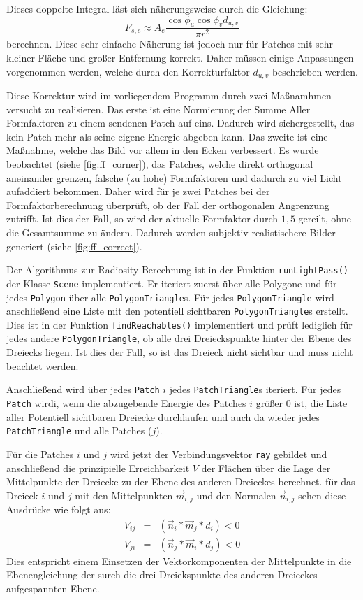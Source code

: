 \documentclass[final,a4paper,11pt,notitlepage,halfparskip]{scrreprt}
\begin{document}
Dieses doppelte Integral läst sich näherungsweise durch die Gleichung:
$$F_{s,e} \approx A_e \frac{\cos\phi_u\cos\phi_v d_{u,v}}{\pi r^2}$$
berechnen. Diese sehr einfache Näherung ist jedoch nur für Patches mit sehr
kleiner Fläche und großer Entfernung korrekt. Daher müssen einige Anpassungen
vorgenommen werden, welche durch den Korrekturfaktor $d_{u,v}$ beschrieben
werden.

Diese Korrektur wird im vorliegendem Programm durch zwei Maßnamhmen versucht zu
realisieren. Das erste ist eine Normierung der Summe Aller Formfaktoren zu einem
sendenen Patch auf eins. Dadurch wird sichergestellt, das kein Patch mehr als
seine eigene Energie abgeben kann. Das zweite ist eine Maßnahme, welche das Bild
vor allem in den Ecken verbessert. Es wurde beobachtet (siehe \ref{fig:ff_corner}), 
das Patches, welche direkt orthogonal aneinander grenzen, falsche (zu hohe) 
Formfaktoren und dadurch zu viel Licht aufaddiert bekommen. Daher wird für je
zwei Patches bei der Formfaktorberechnung überprüft, ob der Fall der
orthogonalen Angrenzung zutrifft. Ist dies der Fall, so wird der aktuelle
Formfaktor durch $1,5$ gereilt, ohne die Gesamtsumme zu ändern. Dadurch werden
subjektiv realistischere Bilder generiert (siehe \ref{fig:ff_correct}). 

Der Algorithmus zur Radiosity-Berechnung ist in der Funktion
\texttt{runLightPass()} der Klasse \texttt{Scene} implementiert. Er iteriert 
zuerst über alle Polygone und für jedes \texttt{Polygon} über alle 
\texttt{PolygonTriangle}s. Für jedes \texttt{PolygonTriangle} wird 
anschließend eine Liste mit den potentiell sichtbaren \texttt{PolygonTriangle}s
erstellt. Dies ist in der Funktion \texttt{findReachables()} implementiert und
prüft lediglich für jedes andere \texttt{PolygonTriangle}, ob alle drei 
Dreieckspunkte hinter der Ebene des Dreiecks liegen. Ist dies der Fall, so ist 
das Dreieck nicht sichtbar und muss nicht beachtet werden.

Anschließend wird über jedes \texttt{Patch} $i$ jedes \texttt{PatchTriangle}s
iteriert. Für jedes \texttt{Patch} wirdi, wenn die abzugebende Energie des
Patches $i$ größer $0$ ist, die Liste aller Potentiell sichtbaren
Dreiecke durchlaufen und auch da wieder jedes \texttt{PatchTriangle} und alle
Patches ($j$). 

Für die Patches $i$ und $j$ wird jetzt der Verbindungsvektor \texttt{ray}
gebildet und anschließend die prinzipielle Erreichbarkeit $V$ der Flächen 
über die Lage der Mittelpunkte der Dreiecke zu der Ebene des anderen Dreieckes 
berechnet. für das Dreieck $i$ und $j$ mit den Mittelpunkten $\vec{m}_{i,j}$ und
den Normalen $\vec{n}_{i,j}$ sehen diese Ausdrücke wie folgt aus:
\begin{eqnarray*}
  V_{ij} &=& (\vec{n}_i * \vec{m}_j * d_i) < 0\\
  V_{ji} &=& (\vec{n}_j * \vec{m}_i * d_j) < 0   
\end{eqnarray*}
Dies entspricht einem Einsetzen der Vektorkomponenten der Mittelpunkte in die
Ebenengleichung der surch die drei Dreiekspunkte des anderen Dreieckes
aufgespannten Ebene.
\end{document}
